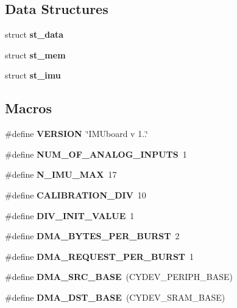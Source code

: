 \subsection*{Data Structures}
\begin{DoxyCompactItemize}
\item 
struct \textbf{ st\+\_\+data}
\item 
struct \textbf{ st\+\_\+mem}
\item 
struct \textbf{ st\+\_\+imu}
\end{DoxyCompactItemize}
\subsection*{Macros}
\begin{DoxyCompactItemize}
\item 
\mbox{\label{globals_8h_a1c6d5de492ac61ad29aec7aa9a436bbf}} 
\#define {\bfseries V\+E\+R\+S\+I\+ON}~\char`\"{}I\+M\+Uboard v 1..\char`\"{}
\item 
\mbox{\label{globals_8h_a181be7cbd0b2da8e8bb809e6313bd67f}} 
\#define {\bfseries N\+U\+M\+\_\+\+O\+F\+\_\+\+A\+N\+A\+L\+O\+G\+\_\+\+I\+N\+P\+U\+TS}~1
\item 
\mbox{\label{globals_8h_a8e4d7a571850d3268c9b780b171474e6}} 
\#define {\bfseries N\+\_\+\+I\+M\+U\+\_\+\+M\+AX}~17
\item 
\mbox{\label{globals_8h_a80db2dce057c92400a7fb1678bc0b0a8}} 
\#define {\bfseries C\+A\+L\+I\+B\+R\+A\+T\+I\+O\+N\+\_\+\+D\+IV}~10
\item 
\mbox{\label{globals_8h_a14df76a41da04070ee775565e8d67e81}} 
\#define {\bfseries D\+I\+V\+\_\+\+I\+N\+I\+T\+\_\+\+V\+A\+L\+UE}~1
\item 
\mbox{\label{globals_8h_abf6c9afec04b86961e177e0646401ace}} 
\#define {\bfseries D\+M\+A\+\_\+\+B\+Y\+T\+E\+S\+\_\+\+P\+E\+R\+\_\+\+B\+U\+R\+ST}~2
\item 
\mbox{\label{globals_8h_ab4613f8bee68bc68fa6fe94a3ae6d568}} 
\#define {\bfseries D\+M\+A\+\_\+\+R\+E\+Q\+U\+E\+S\+T\+\_\+\+P\+E\+R\+\_\+\+B\+U\+R\+ST}~1
\item 
\mbox{\label{globals_8h_a3cc2eedb40809a1f15ad841c8abbcebf}} 
\#define {\bfseries D\+M\+A\+\_\+\+S\+R\+C\+\_\+\+B\+A\+SE}~(C\+Y\+D\+E\+V\+\_\+\+P\+E\+R\+I\+P\+H\+\_\+\+B\+A\+SE)
\item 
\mbox{\label{globals_8h_aa54e301f446a66cbf8c943d920c8e967}} 
\#define {\bfseries D\+M\+A\+\_\+\+D\+S\+T\+\_\+\+B\+A\+SE}~(C\+Y\+D\+E\+V\+\_\+\+S\+R\+A\+M\+\_\+\+B\+A\+SE)
\item 
\mbox{\label{globals_8h_aea55597952638136c7c929b238904c82}} 

\end{DoxyCompactItemize}
